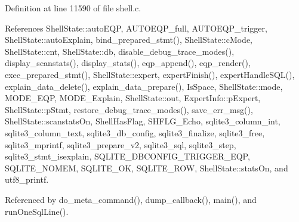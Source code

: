 Definition at line 11590 of file shell.\+c.



References Shell\+State\+::auto\+E\+QP, A\+U\+T\+O\+E\+Q\+P\+\_\+full, A\+U\+T\+O\+E\+Q\+P\+\_\+trigger, Shell\+State\+::auto\+Explain, bind\+\_\+prepared\+\_\+stmt(), Shell\+State\+::c\+Mode, Shell\+State\+::cnt, Shell\+State\+::db, disable\+\_\+debug\+\_\+trace\+\_\+modes(), display\+\_\+scanstats(), display\+\_\+stats(), eqp\+\_\+append(), eqp\+\_\+render(), exec\+\_\+prepared\+\_\+stmt(), Shell\+State\+::expert, expert\+Finish(), expert\+Handle\+S\+Q\+L(), explain\+\_\+data\+\_\+delete(), explain\+\_\+data\+\_\+prepare(), Is\+Space, Shell\+State\+::mode, M\+O\+D\+E\+\_\+\+E\+QP, M\+O\+D\+E\+\_\+\+Explain, Shell\+State\+::out, Expert\+Info\+::p\+Expert, Shell\+State\+::p\+Stmt, restore\+\_\+debug\+\_\+trace\+\_\+modes(), save\+\_\+err\+\_\+msg(), Shell\+State\+::scanstats\+On, Shell\+Has\+Flag, S\+H\+F\+L\+G\+\_\+\+Echo, sqlite3\+\_\+column\+\_\+int, sqlite3\+\_\+column\+\_\+text, sqlite3\+\_\+db\+\_\+config, sqlite3\+\_\+finalize, sqlite3\+\_\+free, sqlite3\+\_\+mprintf, sqlite3\+\_\+prepare\+\_\+v2, sqlite3\+\_\+sql, sqlite3\+\_\+step, sqlite3\+\_\+stmt\+\_\+isexplain, S\+Q\+L\+I\+T\+E\+\_\+\+D\+B\+C\+O\+N\+F\+I\+G\+\_\+\+T\+R\+I\+G\+G\+E\+R\+\_\+\+E\+QP, S\+Q\+L\+I\+T\+E\+\_\+\+N\+O\+M\+EM, S\+Q\+L\+I\+T\+E\+\_\+\+OK, S\+Q\+L\+I\+T\+E\+\_\+\+R\+OW, Shell\+State\+::stats\+On, and utf8\+\_\+printf.



Referenced by do\+\_\+meta\+\_\+command(), dump\+\_\+callback(), main(), and run\+One\+Sql\+Line().


